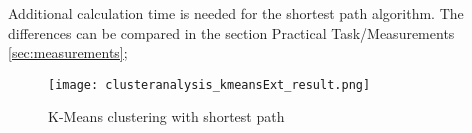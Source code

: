 Additional calculation time is needed for the shortest path algorithm. The differences can be compared in the section Practical Task/Measurements \ref{sec:measurements};

\begin{figure}
    \centering
    \begin{mdframed}[style=mdthight]
        \texttt{[image: clusteranalysis\_kmeansExt\_result.png]}
    \end{mdframed}
    \caption{K-Means clustering with shortest path\label{fig:Kmeansshortestp}}
\end{figure}
